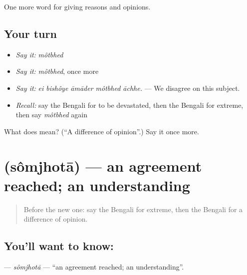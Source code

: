 \begin{grammarlens}[title={What you've built}]
One more word for giving reasons and opinions.
\end{grammarlens}

\subsection*{Your turn}
\begin{itemize}
\raggedright
  \item \emph{Say it:} \emph{môtbhed}
  \item \emph{Say it:} \emph{môtbhed}, once more
  \item \emph{Say it:} \emph{ei bishôye āmāder môtbhed āchhe.} — We disagree on this subject.
  \item \emph{Recall:} say the Bengali for to be devastated, then the Bengali for extreme, then say \emph{môtbhed} again
\end{itemize}

\begin{tcolorbox}[breakable,colback=teal!4,colframe=teal!35!black,title={Before you move on}]
What does  mean? (\textquotedblleft{}A difference of opinion\textquotedblright{}.) Say it once more.
\end{tcolorbox}
\section[\texorpdfstring{\bn{সমঝোতা} (sômjhotā)}{সমঝোতা (sômjhotā)}]{ (sômjhotā) — an agreement reached; an understanding}

\label{lesson:BN-C365-somjhota}



\begin{quote}
Before the new one: say the Bengali for extreme, then the Bengali for a difference of opinion.
\end{quote}

\subsection*{You'll want to know: }
\textbf{} — \emph{sômjhotā} — \textquotedblleft{}an agreement reached; an understanding\textquotedblright{}.

\begin{quote}
    
\end{quote}

